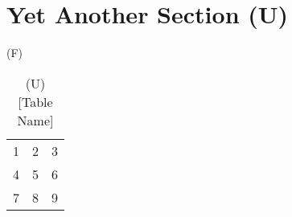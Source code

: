 \section{Yet Another Section (U)}

(F) \lipsum[1] %

\begin{table}
\begin{center}
\begin{tabular}{ l c r }
  1 & 2 & 3 \\
  4 & 5 & 6 \\
  7 & 8 & 9 \\
\end{tabular}
\end{center}
\caption{(U) [Table Name]}
\end{table}
